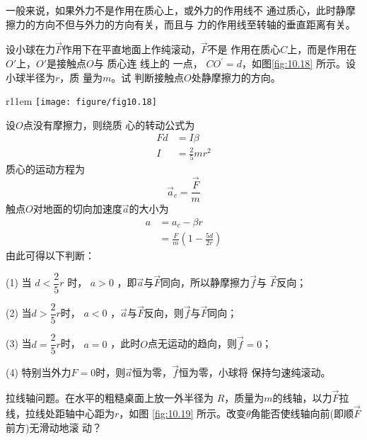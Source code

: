 \documentclass[../outline-of-mechanics.tex]{subfiles}
\begin{document}
一般来说，如果外力不是作用在质心上，或外力的作用线不
通过质心，此时静摩擦力的方向不但与外力的方向有关，而且与
力的作用线至转轴的垂直距离有关。

\example 设小球在力$ \vec{F} $作用下在平直地面上作纯滚动，$ \vec{F} $不是
作用在质心$ C $上，而是作用在$ O' $上，$ O' $是接触点$ O $与
质心连
\clearpage\noindent
线上的
一点， $ C O ^ { \prime } = d $，如图\ref{fig:10.18} 所示。设小球半径为$ r $，质
量为$ m $。试
判断接触点$ O $处静摩擦力的方向。

\begin{wrapfigure}[8]{r}{11em}
  \centering
  \texttt{[image: figure/fig10.18]}
  \caption{}
  \label{fig:10.18}
\end{wrapfigure}
\solution 设$ O $点没有摩擦力，则绕质
心的转动公式为
\begin{equation*}
  \begin{split}
    F d &= I \beta \\
    I &= \frac { 2 } { 5 } m r ^ { 2 }
  \end{split}
\end{equation*}
质心的运动方程为
\begin{equation*}
  \vec{a} _ { c } = \frac { \vec{F} } { m }
\end{equation*}
触点$ O $对地面的切向加速度$ \vec{a} $的大小为
\begin{equation*}
  \begin{split}
    a &= a _ { c } - \beta r \\
    &= \frac { F } { m } \left( 1 - \frac { 5 d } { 2 r } \right)
  \end{split}
\end{equation*}
由此可得以下判断：

(1) 当 $ d < \dfrac { 2 } { 5 } r $ 时， $ a > 0 $ ，即$ \vec{a} $与$ \vec{F} $同向，所以静摩擦力$ \vec{f} $与
$ \vec{F} $反向；

(2) 当$ d > \dfrac { 2 } { 5 } r $时， $ a < 0 $ ，$ \vec{a} $与$ \vec{F} $反向，则$ \vec{f} $与$ \vec{F} $同向；

(3) 当$ d = \dfrac { 2 } { 5 } r $时， $ a = 0 $ ，此时$ O $点无运动的趋向，则$ \vec{f} = 0 $；

(4) 特别当外力$ F=0 $时，则$ \vec{a} $恒为零，$ \vec{f} $恒为零，小球将
保持匀速纯滚动。

\example 拉线轴问题。在水平的粗糙桌面上放一外半径为
$ R $，质量为$ m $的线轴，以力$ \vec{F} $拉线，拉线处距轴中心距为$ r $，如图
\ref{fig:10.19} 所示。改变$ \theta $角能否使线轴向前(即顺$ \vec{F} $前方)无滑动地滚
动？
\end{document}
